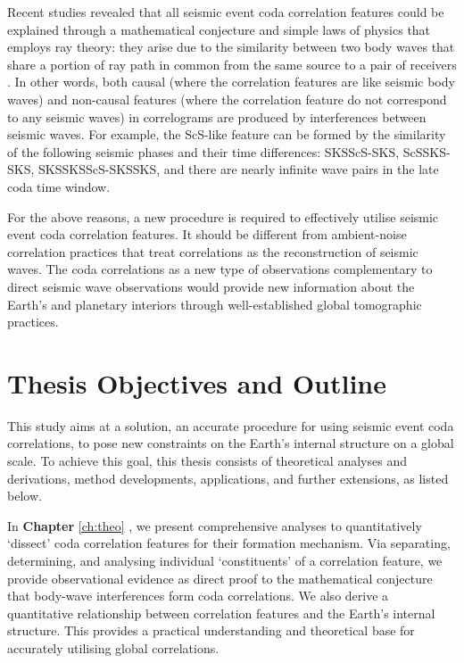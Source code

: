 Recent studies revealed that all seismic event coda correlation features could be explained through a mathematical conjecture and simple laws of physics that employs ray theory: they arise due to the similarity between two body waves that share a portion of ray path in common from the same source to a pair of receivers 
\citep{pham_earths_2018,tkalcic_shear_2018,kennett_nature_2018}. 
In other words, both causal (where the correlation features are like seismic body waves) and non-causal features (where the correlation feature do not correspond to any seismic waves) in correlograms are produced by interferences between seismic waves. For example, the ScS-like feature can be formed by the similarity of the following seismic phases and their time differences: SKSScS-SKS, ScSSKS-SKS, SKSSKSScS-SKSSKS, and there are nearly infinite wave pairs in the late coda time window.





For the above reasons, a new procedure is required to effectively utilise seismic event coda correlation features. It should be different from ambient-noise correlation practices that treat correlations as the reconstruction of seismic waves. The coda correlations as a new type of observations complementary to direct seismic wave observations would provide new information about the Earth's and planetary interiors through well-established global tomographic practices.



\section{Thesis Objectives and Outline}\label{sec:intro_objectives}

This study aims at a solution, an accurate procedure for using seismic event coda correlations, to pose new constraints on the Earth's internal structure on a global scale. To achieve this goal, this thesis consists of theoretical analyses and derivations, method developments, applications, and further extensions, as listed below.

In \textbf{Chapter} \ref{ch:theo} \citep{wang2020seismic}, we present comprehensive analyses to quantitatively `dissect' coda correlation features for their formation mechanism. Via separating, determining, and analysing individual `constituents' of a correlation feature, we provide observational evidence as direct proof to the mathematical conjecture that body-wave interferences form coda correlations. We also derive a quantitative relationship between correlation features and the Earth's internal structure. This provides a practical understanding and theoretical base for accurately utilising global correlations.

